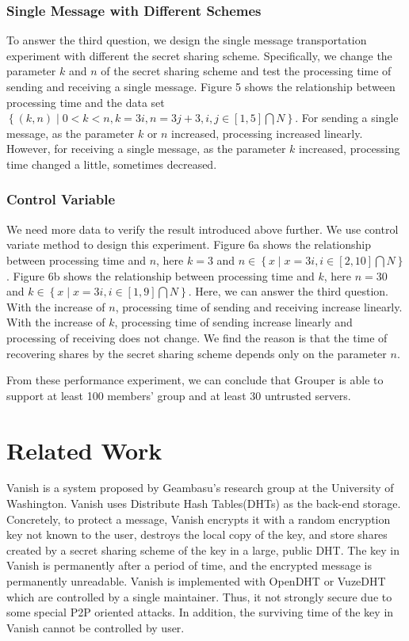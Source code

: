 \documentclass[twocolumn,10pt]{article}
\begin{document}
\subsubsection{Single Message with Different Schemes}

To answer the third question, we design the single message transportation experiment with different the secret sharing scheme.
Specifically, we change the parameter ${k}$  and ${n}$ of the secret sharing scheme and test the processing time of sending and receiving a single message.
Figure 5 shows the relationship between processing time and the data set ${\left \{ \left (k, n \right )\mid 0< k < n, k=3i, n=3j+3, i, j\in\left [ 1,5 \right ]\bigcap N\right \}}$.
For sending a single message, as the parameter ${k}$ or ${n}$ increased, processing increased linearly.
However, for receiving a single message, as the parameter ${k}$ increased, processing time  changed a little, sometimes decreased.

\subsubsection{Control Variable}

We need more data to verify the result introduced above further. 
We use control variate method to design this experiment.
Figure 6a shows the relationship between processing time and ${n}$, here ${k=3}$ and ${n \in \left \{ x\mid x=3i, i \in \left [ 2, 10 \right ] \bigcap N \right \}}$. 
Figure 6b shows the relationship between processing time and ${k}$, here ${n=30}$ and ${k \in \left \{ x\mid x=3i, i \in \left [ 1, 9 \right ] \bigcap N \right \}}$. 
Here, we can answer the third question.
With the increase of ${n}$, processing time of sending and receiving increase linearly.
With the increase of ${k}$, processing time of sending increase linearly and processing of receiving does not change.
We find the reason is that the time of recovering shares by the secret sharing scheme depends only on the parameter ${n}$.

From these performance experiment, we can conclude that Grouper is able to support at least 100 members' group and at least 30 untrusted servers.

\section{Related Work}

Vanish is a system proposed by Geambasu's research group at the University of Washington. 
Vanish uses Distribute Hash Tables(DHTs) as the back-end storage.
Concretely, to protect a message, Vanish encrypts it with a random encryption key not known to the user, destroys the local copy of the key, and store shares created by a secret sharing scheme of the key in a large, public DHT.
The key in Vanish is permanently after a period of time, and the encrypted message is permanently unreadable.
Vanish is implemented with OpenDHT\cite{rhea2005opendht} or VuzeDHT\cite{vuzedht} which are controlled by a single maintainer. 
Thus, it not strongly secure due to some special P2P oriented attacks\cite{wolchok2010defeating}. 
In addition, the surviving time of the key in Vanish cannot be controlled by user. 
\end{document}
